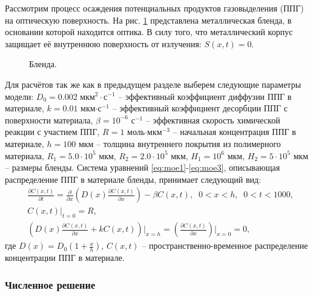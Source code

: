 \documentclass[
11pt,
master, %
subf, %
href, %
colorlinks=true, %
]{disser}
\newcommand*{\PartDif}[2]{\frac{\partial #1}{\partial #2}}
\newcommand*{\PartD}[1]{\frac{\partial}{\partial #1}}
\newcommand*{\SR}[1]{\left( #1 \right)}
\begin{document}
Рассмотрим процесс осаждения потенциальных продуктов газовыделения (ППГ) на оптическую поверхность. На рис. \ref{plm1} представлена металлическая бленда, в основании которой находится оптика. В силу того, что металлический корпус защищает её внутреннюю поверхность от излучения: $S(x,t) = 0$.
\begin{figure}[htbp]
	\caption{Бленда.}\label{plm1}
\end{figure}

Для расчётов так же как в предыдущем разделе выберем следующие параметры модели: $D_0 = 0.002$  мкм$^2\cdot$с$^{-1}$ -- эффективный коэффициент диффузии ППГ в материале, $k = 0.01$ мкм$\cdot$с$^{-1}$ -- эффективный коэффициент десорбции ППГ с поверхности материала, $\beta = 10^{-6}$ с$^{-1}$ -- эффективная скорость химической реакции с участием ППГ, $R = 1$ моль$\cdot$мкм$^{-3}$ -- начальная концентрация ППГ в материале, $h = 100$ мкм -- толщина внутреннего покрытия из полимерного материала, $R_1 = 5.0 \cdot 10^{5}$ мкм, $R_2 = 2.0 \cdot 10^5$ мкм, $H_1 = 10^6$ мкм, $H_2 = 5 \cdot 10^5$ мкм -- размеры бленды. Система уравнений \eqref{eq:moe1}-\eqref{eq:moe3}, описывающая распределение ППГ в материале бленды, принимает следующий вид:
\begin{align}
	&\PartDif{C(x,t)}{t} = \PartD{x}\SR{D(x)\PartDif{C(x,t)}{x}} - \beta C(x,t), \;\; 0 < x < h, \;\; 0 < t < 1000, \label{eq:m1}\\
	&C(x,t)\bigg|_{t = 0} = R, \label{eq:m2}\\
	&\SR{D(x)\PartDif{C(x,t)}{x} + k C(x,t)}\bigg|_{x = h} = \SR{\PartDif{C(x,t)}{x}}\bigg|_{x = 0} = 0, \label{eq:m3}
\end{align}
где $D(x) = D_0\left(1 + \frac{x}{h}\right)$, $C(x,t)$ -- пространственно-временное распределение концентрации ППГ в материале.

\subsubsection{Численное решение}
\end{document}
